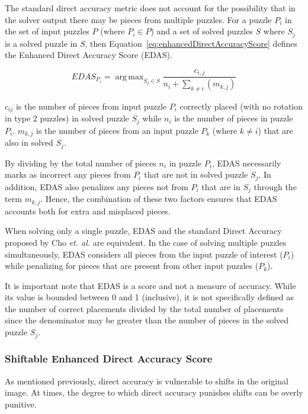 \documentclass{report}
\DeclareMathOperator*{\argmax}{arg\,max} %
\begin{document}
The standard direct accuracy metric does not account for the possibility that in the solver output there may be pieces from multiple puzzles.  For a puzzle $P_i$ in the set of input puzzles $P$ (where $P_i \in P$) and a set of solved puzzles $S$ where $S_j$ is a solved puzzle in $S$, then Equation~\ref{eq:enhancedDirectAccuracyScore} defines the Enhanced Direct Accuracy Score (EDAS).

\begin{equation} \label{eq:enhancedDirectAccuracyScore}
EDAS_{P_i} = \argmax_{S_j \in S}\frac{c_{i,j}}{n_i + \sum_{k \ne i}(m_{k,j})}
\end{equation}

$c_{ij}$ is the number of pieces from input puzzle $P_i$ correctly placed (with no rotation in type 2 puzzles) in solved puzzle $S_j$ while $n_i$ is the number of pieces in puzzle $P_i$. $m_{k,j}$ is the number of pieces from an input puzzle $P_k$ (where $k \ne i$) that are also in solved $S_j$.

By dividing by the total number of pieces $n_i$ in puzzle $P_i$, EDAS necessarily marks as incorrect any pieces from $P_i$ that are not in solved puzzle $S_j$.  In addition, EDAS also penalizes any pieces not from $P_i$ that are in $S_j$ through the term $m_{k,j}$.  Hence, the combination of these two factors ensures that EDAS accounts both for extra and misplaced pieces.

When solving only a single puzzle, EDAS and the standard Direct Accuracy proposed by Cho \textit{et. al.} are equivalent.  In the case of solving multiple puzzles simultaneously, EDAS considers all pieces from the input puzzle of interest ($P_i$) while penalizing for pieces that are present from other input puzzles ($P_k$). 

It is important note that EDAS is a score and not a measure of accuracy. While its value is bounded between 0 and 1 (inclusive), it is not specifically defined as the number of correct placements divided by the total number of placements since the denominator may be greater than the number of pieces in the solved puzzle $S_j$.

\subsubsection{Shiftable Enhanced Direct Accuracy Score}\label{sec:shiftableEnhancedDirectAccuracy}

As mentioned previously, direct accuracy is vulnerable to shifts in the original image.  At times, the degree to which direct accuracy punishes shifts can be overly punitive. 
\end{document}
